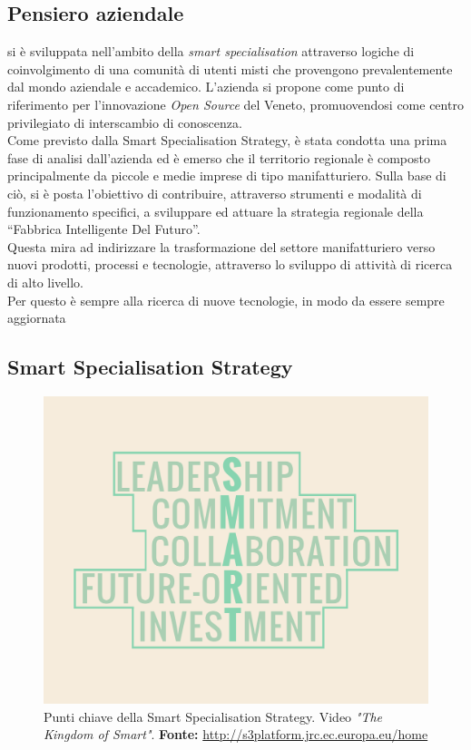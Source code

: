 \subsection{Pensiero aziendale}
\lab{} si è sviluppata nell'ambito della \textit{smart specialisation} attraverso logiche di coinvolgimento di una comunità di utenti misti che provengono prevalentemente dal mondo aziendale e accademico. 
L'azienda si propone come punto di riferimento per l'innovazione \textit{Open Source} del Veneto, promuovendosi come centro privilegiato di interscambio di conoscenza.\\
Come previsto dalla Smart Specialisation Strategy, è stata condotta una prima fase di analisi dall'azienda ed è emerso che il territorio regionale è composto principalmente da piccole e medie imprese di tipo manifatturiero. Sulla base di ciò, \lab{} si è posta l'obiettivo di contribuire, attraverso strumenti e modalità di funzionamento specifici, a sviluppare ed attuare la strategia regionale della ``Fabbrica Intelligente Del Futuro''.\\
Questa mira ad indirizzare la trasformazione del settore manifatturiero verso nuovi prodotti, processi e tecnologie, attraverso lo sviluppo di attività di ricerca di alto livello.\\
Per questo \lab{} è sempre alla ricerca di nuove tecnologie, in modo da essere sempre aggiornata 

\subsection{Smart Specialisation Strategy}
\begin{figure}[H]
	\begin{center}
	\includegraphics[scale=0.15]{immagini/SMART.png}
	\caption{Punti chiave della Smart Specialisation Strategy. Video \textit{"The Kingdom of Smart"}.
	\small{\textbf{Fonte:} \url{http://s3platform.jrc.ec.europa.eu/home}}		
				}
	\end{center}
\end{figure}


